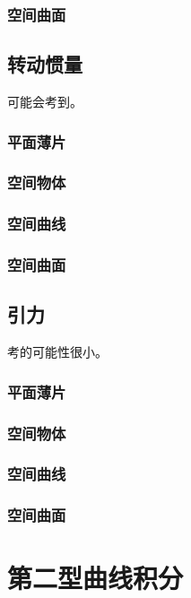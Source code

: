 \subsubsection{空间曲面}

\subsection{转动惯量}

可能会考到。

\subsubsection{平面薄片}

\subsubsection{空间物体}

\subsubsection{空间曲线}

\subsubsection{空间曲面}

\subsection{引力}

考的可能性很小。

\subsubsection{平面薄片}

\subsubsection{空间物体}

\subsubsection{空间曲线}

\subsubsection{空间曲面}

\section{第二型曲线积分}


